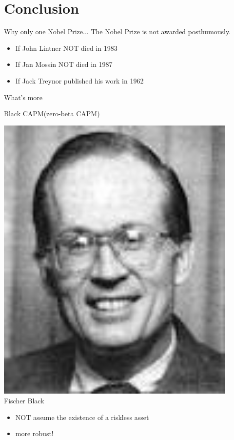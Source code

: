 \documentclass{beamer}
\begin{document}
\section{Conclusion}
\begin{frame}{Why only one Nobel Prize...}
	\alert{The Nobel Prize is not awarded posthumously.}
	\begin{itemize}
		\item<2-> If John Lintner NOT died in 1983 
		\item<3-> If Jan Mossin NOT died in 1987
		\item<4-> If Jack Treynor published his work in 1962
	\end{itemize}
\end{frame}
\begin{frame}{What's more}
	\begin{block}{Black CAPM(zero-beta CAPM)}
		\begin{minipage}{0.3\textwidth}
			\centering
			\includegraphics[width=0.9\textwidth]{Fischer.jpg}\\
			Fischer Black
		\end{minipage}
		\begin{minipage}{0.48\textwidth}
			\begin{itemize}
				\item {\color{red}NOT} assume the existence of a riskless asset
				\item more robust!
			\end{itemize}
		\end{minipage}
	\end{block}
\end{frame}
\end{document}
